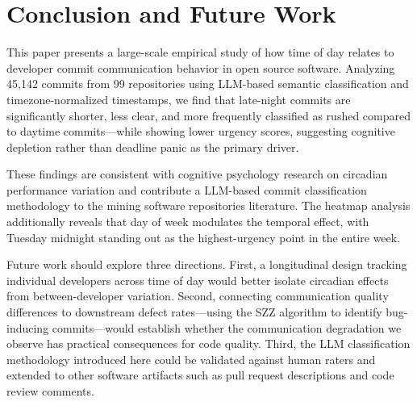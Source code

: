 \documentclass[sigconf]{acmart}
\begin{document}
\section{Conclusion and Future Work}

This paper presents a large-scale empirical study of how time of day relates to developer commit communication behavior in open source software. Analyzing 45,142 commits from 99 repositories using LLM-based semantic classification and timezone-normalized timestamps, we find that late-night commits are significantly shorter, less clear, and more frequently classified as rushed compared to daytime commits---while showing lower urgency scores, suggesting cognitive depletion rather than deadline panic as the primary driver.

These findings are consistent with cognitive psychology research on circadian performance variation and contribute a LLM-based commit classification methodology to the mining software repositories literature. The heatmap analysis additionally reveals that day of week modulates the temporal effect, with Tuesday midnight standing out as the highest-urgency point in the entire week.

Future work should explore three directions. First, a longitudinal design tracking individual developers across time of day would better isolate circadian effects from between-developer variation. Second, connecting communication quality differences to downstream defect rates---using the SZZ algorithm to identify bug-inducing commits---would establish whether the communication degradation we observe has practical consequences for code quality. Third, the LLM classification methodology introduced here could be validated against human raters and extended to other software artifacts such as pull request descriptions and code review comments.
\end{document}
